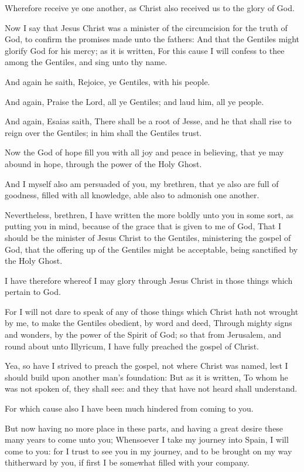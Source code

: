 \Verse Wherefore receive ye one another, as Christ also received us to the glory of God.

\Verse Now I say that Jesus Christ was a minister of the circumcision for the truth of God, to confirm the promises made unto the fathers: \Verse And that the Gentiles might glorify God for his mercy; as it is written, For this cause I will confess to thee among the Gentiles, and sing unto thy name.

\Verse And again he saith, Rejoice, ye Gentiles, with his people.

\Verse And again, Praise the Lord, all ye Gentiles; and laud him, all ye people.

\Verse And again, Esaias saith, There shall be a root of Jesse, and he that shall rise to reign over the Gentiles; in him shall the Gentiles trust.

\Verse Now the God of hope fill you with all joy and peace in believing, that ye may abound in hope, through the power of the Holy Ghost.

\Verse And I myself also am persuaded of you, my brethren, that ye also are full of goodness, filled with all knowledge, able also to admonish one another.

\Verse Nevertheless, brethren, I have written the more boldly unto you in some sort, as putting you in mind, because of the grace that is given to me of God, \Verse That I should be the minister of Jesus Christ to the Gentiles, ministering the gospel of God, that the offering up of the Gentiles might be acceptable, being sanctified by the Holy Ghost.

\Verse I have therefore whereof I may glory through Jesus Christ in those things which pertain to God.

\Verse For I will not dare to speak of any of those things which Christ hath not wrought by me, to make the Gentiles obedient, by word and deed, \Verse Through mighty signs and wonders, by the power of the Spirit of God; so that from Jerusalem, and round about unto Illyricum, I have fully preached the gospel of Christ.

\Verse Yea, so have I strived to preach the gospel, not where Christ was named, lest I should build upon another man's foundation: \Verse But as it is written, To whom he was not spoken of, they shall see: and they that have not heard shall understand.

\Verse For which cause also I have been much hindered from coming to you.

\Verse But now having no more place in these parts, and having a great desire these many years to come unto you; \Verse Whensoever I take my journey into Spain, I will come to you: for I trust to see you in my journey, and to be brought on my way thitherward by you, if first I be somewhat filled with your company.

